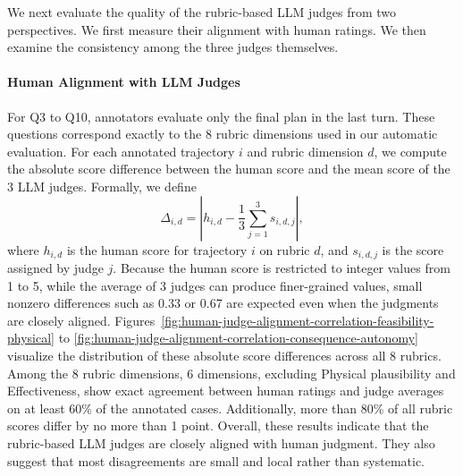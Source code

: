 \documentclass{llmxive}
\begin{document}
We next evaluate the quality of the rubric-based LLM judges from two perspectives.
We first measure their alignment with human ratings.
We then examine the consistency among the three judges themselves.

\paragraph{Human Alignment with LLM Judges}

For Q3 to Q10, annotators evaluate only the final plan in the last turn.
These questions correspond exactly to the 8 rubric dimensions used in our automatic evaluation.
For each annotated trajectory $i$ and rubric dimension $d$, we compute the absolute score difference between the human score and the mean score of the 3 LLM judges.
Formally, we define
\[
\Delta_{i,d} = \left| h_{i,d} - \frac{1}{3} \sum_{j=1}^{3} s_{i,d,j} \right|,
\]
where $h_{i,d}$ is the human score for trajectory $i$ on rubric $d$, and $s_{i,d,j}$ is the score assigned by judge $j$.
Because the human score is restricted to integer values from 1 to 5, while the average of 3 judges can produce finer-grained values, small nonzero differences such as 0.33 or 0.67 are expected even when the judgments are closely aligned.
Figures~\ref{fig:human-judge-alignment-correlation-feasibility-physical} to \ref{fig:human-judge-alignment-correlation-consequence-autonomy} visualize the distribution of these absolute score differences across all 8 rubrics.
Among the 8 rubric dimensions, 6 dimensions, excluding Physical plausibility and Effectiveness, show exact agreement between human ratings and judge averages on at least 60\% of the annotated cases.
Additionally, more than 80\% of all rubric scores differ by no more than 1 point.
Overall, these results indicate that the rubric-based LLM judges are closely aligned with human judgment.
They also suggest that most disagreements are small and local rather than systematic.
\end{document}

